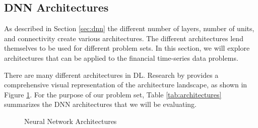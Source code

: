 \documentclass[11pt]{article}
\begin{document}
\subsection{DNN Architectures} \label{sec:dnn-architectures}

As described in Section \ref{sec:dnn} the different number of layers, number of units, and connectivity create various architectures. The different architectures lend themselves to be used for different problem sets. In this section, we will explore architectures that can be applied to the financial time-series data problems.

There are many different architectures \cite{Deng2014ALearning, Schmidhuber2015DeepOverview} in DL. Research by \citet{vanVeen2017NeuralInstitute} provides a comprehensive visual representation of the architecture landscape, as shown in Figure \ref{fig:neural-networks}. For the purpose of our problem set, Table \ref{tab:architectures} summarizes the DNN architectures that we will be evaluating.

\begin{figure}[!ht]
	\centering
	\caption{Neural Network Architectures}
	\label{fig:neural-networks}
\end{figure}
\end{document}
